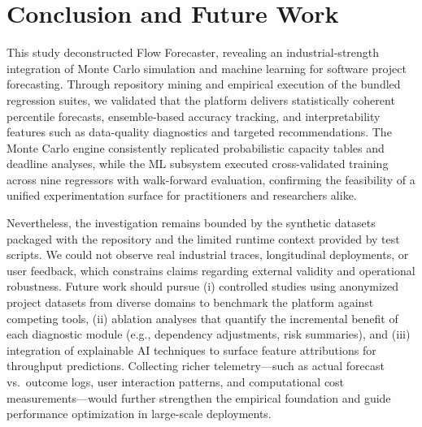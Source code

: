 \section{Conclusion and Future Work}
This study deconstructed Flow Forecaster, revealing an industrial-strength integration of Monte Carlo simulation and machine learning for software project forecasting. Through repository mining and empirical execution of the bundled regression suites, we validated that the platform delivers statistically coherent percentile forecasts, ensemble-based accuracy tracking, and interpretability features such as data-quality diagnostics and targeted recommendations. The Monte Carlo engine consistently replicated probabilistic capacity tables and deadline analyses, while the ML subsystem executed cross-validated training across nine regressors with walk-forward evaluation, confirming the feasibility of a unified experimentation surface for practitioners and researchers alike.

Nevertheless, the investigation remains bounded by the synthetic datasets packaged with the repository and the limited runtime context provided by test scripts. We could not observe real industrial traces, longitudinal deployments, or user feedback, which constrains claims regarding external validity and operational robustness. Future work should pursue (i) controlled studies using anonymized project datasets from diverse domains to benchmark the platform against competing tools, (ii) ablation analyses that quantify the incremental benefit of each diagnostic module (e.g., dependency adjustments, risk summaries), and (iii) integration of explainable AI techniques to surface feature attributions for throughput predictions. Collecting richer telemetry---such as actual forecast vs.\ outcome logs, user interaction patterns, and computational cost measurements---would further strengthen the empirical foundation and guide performance optimization in large-scale deployments.
